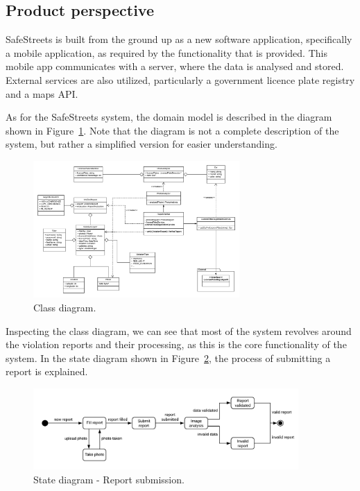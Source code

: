 \subsection{Product perspective}

SafeStreets is built from the ground up as a new software application, specifically a mobile application, as required by the functionality that is provided. This mobile app communicates with a server, where the data is analysed and stored. External services are also utilized, particularly a government licence plate registry and a maps API.

As for the SafeStreets system, the domain model is described in the diagram shown in Figure~\ref{fig:class-general}. Note that the diagram is not a complete description of the system, but rather a simplified version for easier understanding.

\begin{figure}[!h]
\centering
\includegraphics[angle=-90,origin=c,width=0.7\textwidth]{Images/class-general.png}
\caption{\label{fig:class-general}Class diagram.}
\end{figure}

Inspecting the class diagram, we can see that most of the system revolves around the violation reports and their processing, as this is the core functionality of the system.
In the state diagram shown in Figure~\ref{fig:state-report-submission}, the process of submitting a report is explained.

\begin{figure}[!h]
\centering
\includegraphics[width=0.9\textwidth]{Images/state-report-submission.png}
\caption{\label{fig:state-report-submission}State diagram - Report submission.}
\end{figure}

